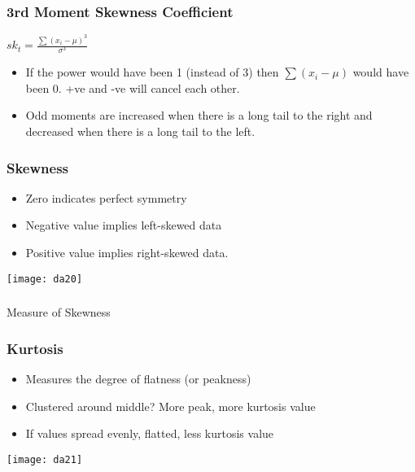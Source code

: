 \begin{frame}[fragile]\frametitle{3rd Moment Skewness Coefficient}	
$sk_t = \frac{\sum (x_i - \mu)^3}{\sigma^3}$

\begin{itemize}
\item If the power would have been 1 (instead of 3) then $\sum (x_i -\mu)$ would have been 0. +ve and -ve will cancel each other.
\item  Odd moments are increased when there is a long tail to the right and decreased when there is a long tail to the left. 
\end{itemize}

\end{frame}

\begin{frame}[fragile]\frametitle{Skewness}	
\begin{itemize}
\item  Zero indicates perfect symmetry
\item  Negative value implies left-skewed data
\item Positive value implies right-skewed data.
\end{itemize}
\begin{center}
\texttt{[image: da20]}
\end{center}
\end{frame}

\begin{frame}[fragile]\frametitle{}
\begin{center}
{\Large Measure of Skewness}
\end{center}
\end{frame}


\begin{frame}[fragile]\frametitle{Kurtosis}	
\begin{itemize}
\item  Measures the degree of flatness (or peakness)
\item Clustered around middle? More peak, more kurtosis value
\item If values spread evenly, flatted, less kurtosis value
\end{itemize}
\begin{center}
\texttt{[image: da21]}
\end{center}
\end{frame}

